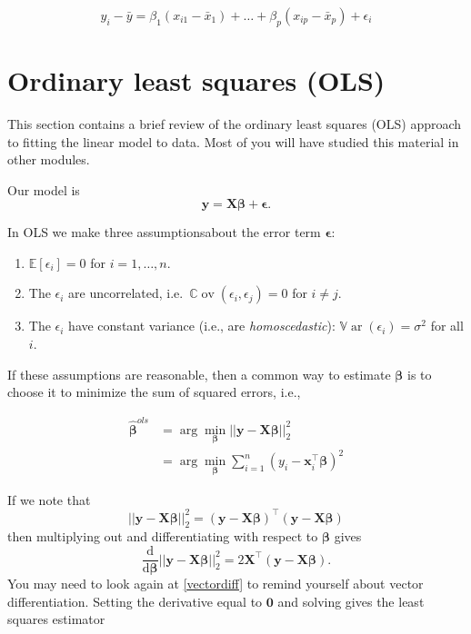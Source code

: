 \documentclass[
]{book}
\providecommand{\tightlist}{%
  \setlength{\itemsep}{0pt}\setlength{\parskip}{0pt}}
\theoremstyle{definition}
\theoremstyle{definition}
\theoremstyle{definition}
\theoremstyle{definition}
\theoremstyle{remark}
\begin{document}
\[y_i - \bar{y} = \beta_1 (x_{i1}-\bar{x}_1)+\ldots+\beta_p (x_{ip}-\bar{x}_p)+\epsilon_i\]

\hypertarget{ordinary-least-squares-ols}{%
\section{Ordinary least squares (OLS)}\label{ordinary-least-squares-ols}}

This section contains a brief review of the ordinary least squares (OLS) approach to fitting the linear model to data. Most of you will have studied this material in other modules.

Our model is
\[
\mathbf y=\mathbf X\boldsymbol \beta+{\pmb \epsilon}.
\]

In OLS we make three assumptionsabout the error term \(\boldsymbol \epsilon\):

\begin{enumerate}
\def\labelenumi{\arabic{enumi}.}
\tightlist
\item
  \({\mathbb{E}}[\epsilon_i]=0\) for \(i=1, \ldots , n\).
\item
  The \(\epsilon_i\) are uncorrelated, i.e.~\({\mathbb{C}\operatorname{ov}}(\epsilon_i, \epsilon_j)=0\) for \(i \neq j\).
\item
  The \(\epsilon_i\) have constant variance (i.e., are \emph{homoscedastic}): \({\mathbb{V}\operatorname{ar}}(\epsilon_i)=\sigma^2\) for all \(i\).
\end{enumerate}

If these assumptions are reasonable, then
a common way to estimate \(\boldsymbol \beta\) is to choose it to minimize the sum of squared errors, i.e.,

\begin{align*}
{\hat{\boldsymbol \beta}}^{ols} &= \arg \min_{\boldsymbol \beta} || \mathbf y- \mathbf X\boldsymbol \beta||_2^2\\
&= \arg \min_{\boldsymbol \beta} \sum_{i=1}^n (y_i - \mathbf x_i^\top \boldsymbol \beta)^2
\end{align*}

If we note that
\[|| \mathbf y- \mathbf X\boldsymbol \beta||_2^2 = (\mathbf y-\mathbf X\boldsymbol \beta)^\top(\mathbf y-\mathbf X\boldsymbol \beta) \]
then multiplying out and differentiating with respect to \(\boldsymbol \beta\) gives
\[\frac{\mathrm d}{\mathrm d\boldsymbol \beta} || \mathbf y- \mathbf X\boldsymbol \beta||_2^2 = 2\mathbf X^\top (\mathbf y- \mathbf X\boldsymbol \beta).\]
You may need to look again at \ref{vectordiff} to remind yourself about vector differentiation. Setting the derivative equal to \({\boldsymbol 0}\) and solving gives the least squares estimator
\end{document}
